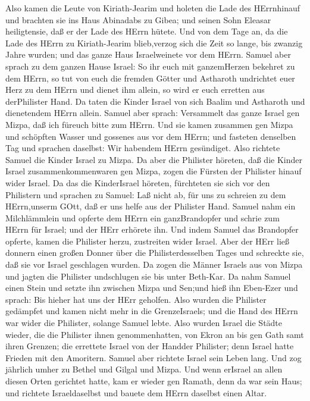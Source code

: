  Also kamen die Leute von Kiriath-Jearim und holeten die
Lade des HErrnhinauf und brachten sie ins Haus Abinadabs zu Gibea; und
seinen Sohn Eleasar heiligtensie, daß er der Lade des HErrn hütete.
 Und von dem Tage an, da die Lade des HErrn zu
Kiriath-Jearim blieb,verzog sich die Zeit so lange, bis zwanzig Jahre
wurden; und das ganze Haus Israelweinete vor dem HErrn. 
Samuel aber sprach zu dem ganzen Hause Israel: So ihr euch mit
ganzemHerzen bekehret zu dem HErrn, so tut von euch die fremden Götter
und Astharoth undrichtet euer Herz zu dem HErrn und dienet ihm allein,
so wird er euch erretten aus derPhilister Hand.  Da taten
die Kinder Israel von sich Baalim und Astharoth und dienetendem HErrn
allein.  Samuel aber sprach: Versammelt das ganze Israel gen
Mizpa, daß ich füreuch bitte zum HErrn.  Und sie kamen
zusammen gen Mizpa und schöpften Wasser und gossenes aus vor dem HErrn;
und fasteten denselben Tag und sprachen daselbst: Wir habendem HErrn
gesündiget. Also richtete Samuel die Kinder Israel zu Mizpa.
 Da aber die Philister höreten, daß die Kinder Israel
zusammenkommenwaren gen Mizpa, zogen die Fürsten der Philister hinauf
wider Israel. Da das die KinderIsrael höreten, fürchteten sie sich vor
den Philistern  und sprachen zu Samuel: Laß nicht ab, für
uns zu schreien zu dem HErrn,unserm GOtt, daß er uns helfe aus der
Philister Hand.  Samuel nahm ein Milchlämmlein und opferte
dem HErrn ein ganzBrandopfer und schrie zum HErrn für Israel; und der
HErr erhörete ihn.  Und indem Samuel das Brandopfer
opferte, kamen die Philister herzu, zustreiten wider Israel. Aber der
HErr ließ donnern einen großen Donner über die Philisterdesselben Tages
und schreckte sie, daß sie vor Israel geschlagen wurden. 
Da zogen die Männer Israels aus von Mizpa und jagten die Philister
undschlugen sie bis unter Beth-Kar.  Da nahm Samuel einen
Stein und setzte ihn zwischen Mizpa und Sen;und hieß ihn Eben-Ezer und
sprach: Bis hieher hat uns der HErr geholfen.  Also wurden
die Philister gedämpfet und kamen nicht mehr in die GrenzeIsraels; und
die Hand des HErrn war wider die Philister, solange Samuel lebte.
 Also wurden Israel die Städte wieder, die die Philister
ihnen genommenhatten, von Ekron an bis gen Gath samt ihren Grenzen; die
errettete Israel von der Handder Philister; denn Israel hatte Frieden
mit den Amoritern.  Samuel aber richtete Israel sein Leben
lang.  Und zog jährlich umher zu Bethel und Gilgal und
Mizpa. Und wenn erIsrael an allen diesen Orten gerichtet hatte,
 kam er wieder gen Ramath, denn da war sein Haus; und
richtete Israeldaselbst und bauete dem HErrn daselbst einen Altar.

